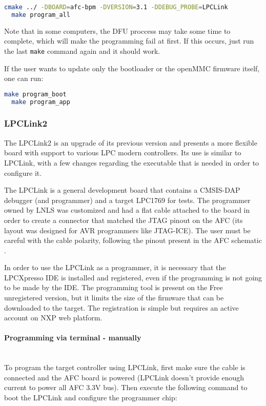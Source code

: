 \documentclass[letterpaper,12pt, titlepage]{article}
\newcommand{\newparagraph}[1]{\paragraph{#1}\mbox{}\\}
\begin{document}
\begin{lstlisting}[language=bash]
  cmake ../ -DBOARD=afc-bpm -DVERSION=3.1 -DDEBUG_PROBE=LPCLink
  make program_all
\end{lstlisting}

Note that in some computers, the DFU proccess may take some time to complete, which will make the programming fail at first. If this occurs, just run the last \texttt{make} command again and it should work.

If the user wants to update only the bootloader or the openMMC firmware itself, one can run:

\begin{lstlisting}[language=bash]
  make program_boot
  make program_app
\end{lstlisting}

\subsubsection{LPCLink2}
The LPCLink2 is an upgrade of its previous version and presents a more flexible board with support to various LPC modern controllers. Its use is similar to LPCLink, with a few changes regarding the executable that is needed in order to configure it.

The LPCLink is a general development board that contains a CMSIS-DAP debugger (and programmer) and a target LPC1769 for tests. The programmer owned by LNLS was customized and had a flat cable attached to the board in order to create a connector that matched the JTAG pinout on the AFC (its layout was designed for AVR programmers like JTAG-ICE).
The user must be careful with the cable polarity, following the pinout present in the AFC schematic \cite{afc-schema}.

In order to use the LPCLink as a programmer, it is necessary that the LPCXpresso IDE is installed and registered, even if the programming is not going to be made by the IDE. The programming tool is present on the Free unregistered version, but it limits the size of the firmware that can be downloaded to the target. The registration is simple but requires an active account on NXP web platform.

\newparagraph{Programming via terminal - manually}
To program the target controller using LPCLink, first make sure the cable is connected and the AFC board is powered (LPCLink doesn't provide enough current to power all AFC 3.3V bus). Then execute the following command to boot the LPCLink and configure the programmer chip:
\end{document}
